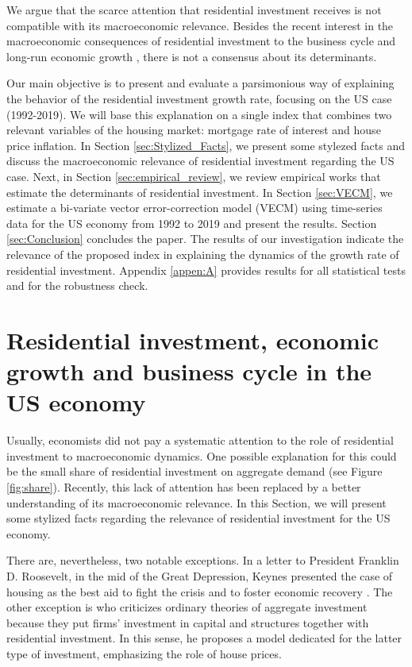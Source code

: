 \documentclass[12pt, a4paper]{article}
\begin{document}
We argue that the scarce attention that residential investment receives is not compatible with its macroeconomic relevance.
Besides the recent interest in the macroeconomic consequences of residential investment to the business cycle and long-run economic growth \cite{fiebiger_trend_2017,fiebiger_semi-autonomous_2018,perez_Montiel_2021}, there is not a consensus about its determinants.

Our main objective is to present and evaluate a parsimonious way of explaining the behavior of the residential investment growth rate, focusing on the US case (1992-2019).
We will base this explanation on a single index that combines two relevant variables of the housing market: mortgage rate of interest and house price inflation.
In Section \ref{sec:Stylized_Facts}, we present some stylezed facts and discuss the macroeconomic relevance of residential investment regarding the US case.
Next, in Section \ref{sec:empirical_review}, we review empirical works that estimate the determinants of residential investment.
In Section \ref{sec:VECM}, we estimate a bi-variate vector error-correction model (VECM) using time-series data for the US economy from 1992 to 2019 and present the results.
Section \ref{sec:Conclusion} concludes the paper.
The results of our investigation indicate the relevance of the proposed index in explaining the dynamics of the growth rate of residential investment.
Appendix \ref{appen:A} provides results for all statistical tests and for the robustness check.



\section{Residential investment, economic growth and business cycle in the US economy}
\label{sec:orge549a7d}
\label{sec:Stylized_Facts}
Usually, economists did not pay a systematic attention to the role of residential investment to macroeconomic dynamics.
One possible explanation for this could be the small share of residential investment on aggregate demand (see Figure \ref{fig:share}).
Recently, this lack of attention has been replaced by a better understanding of its macroeconomic relevance.
In this Section, we will present some stylized facts regarding the relevance of residential investment for the US economy.

There are, nevertheless, two notable exceptions.
In a letter to President Franklin D. Roosevelt, in the mid of the Great Depression, Keynes presented the case of housing as the best aid to fight the crisis and to foster economic recovery \cite[p.~436]{keynes_collected_1978}.
The other exception is \textcite{duesenberry_investment_1958} who criticizes ordinary theories of aggregate investment because they put firms’ investment in capital and structures together with residential investment.
In this sense, he proposes a model dedicated for the latter type of investment, emphasizing the role of house prices.
\end{document}

